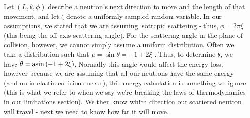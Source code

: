 Let $(L, \theta, \phi)$ describe a neutron's next direction to move and the length of that movement, and let $\xi$ 
denote a uniformly sampled random variable. In our assumptions, we stated 
that we are assuming isotropic scattering - thus, $\phi = 2\pi \xi$ (this being the off axis scattering angle). 
For the scattering angle in the plane of collision, however, we cannot simply assume a uniform distribution. 
Often we take a distribution such that $\mu = \sin \theta = -1 + 2\xi$ \cite{mc-methods-neutron-transport-phd}. Thus, 
to determine $\theta$, we have $\theta = \asin \left (-1 + 2\xi \right )$. Normally this angle would affect the energy loss, 
however because we are assuming that all our neutrons have the same energy (and no in-elastic collisions occur), this 
energy calculation is something we ignore (this is what we refer to when we say we're breaking the laws of 
thermodynamics in our limitations section). We then know which direction our scattered neutron will travel - next we 
need to know how far it will move.

